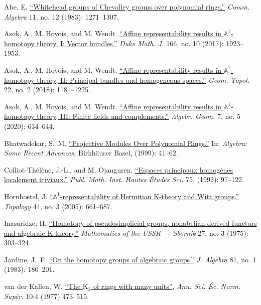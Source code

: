 \documentclass[oneside, 11pt]{amsart}
\numberwithin{equation}{section}
\newcommand{\K}{{\mathrm{K}}}
\theoremstyle{definition}
\theoremstyle{definition}
\theoremstyle{remark}
\begin{document}
\begin{thebibliography}{0}

Abe, E.
\href{http://dx.doi.org/10.1080/00927878308822906}{``Whitehead groups of {C}hevalley groups over polynomial rings.''}
\textit{Comm. Algebra} 11, no. 12 (1983): {1271--1307}.

Asok, A., M. Hoyois, and M. Wendt.
\href{http://dx.doi.org/10.1215/00127094-0000014X}{``Affine representability results in $\mathbb{A}^1$-homotopy theory, I: Vector bundles.''}
\textit{Duke Math. J.} 166, no. 10 (2017): 1923--1953.

Asok, A., M. Hoyois, and M. Wendt.
\href{http://dx.doi.org/10.2140/gt.2018.22.1181}{``Affine representability results in $\mathbb{A}^1$-homotopy theory, II: Principal bundles and homogeneous spaces.''}
\textit{Geom. Topol.} 22, no. 2 (2018): 1181--1225.
  
Asok, A., M. Hoyois, and M. Wendt.
\href{http://dx.doi.org/10.14231/AG-2020-023}{``Affine representability results in $\mathbb{A}^1$-homotopy theory, III: Finite fields and complements.''}
\textit{Algebr. Geom.} 7, no. 5 (2020): 634--644.

Bhatwadekar, S.~M.
\href{http://dx.doi.org/10.1007/978-3-0348-9996-3_3}{``Projective Modules Over Polynomial Rings.''}
In: \textit{Algebra: Some Recent Advances,} Birkh{\"a}user Basel, (1999): 41--62.

Colliot-Th{\'e}l{\`e}ne, J.-L., and M. Ojanguren.
\href{http://www.numdam.org/article/PMIHES_1992__75__97_0.pdf}{``Espaces principaux homog{\`e}nes localement triviaux.''} \textit{Publ. Math. Inst. Hautes {\'E}tudes Sci.} 75, (1992): {97--122}.

Hornbostel, J.
\href{http://dx.doi.org/10.1016/j.top.2004.10.004}{``$\mathbb{A}^1$-representability of Hermitian K-theory and Witt groups.''} \textit{Topology} {44}, no. {3} (2005): {661--687}.  

Inasaridze, H.
\href{http://dx.doi.org/10.1070/sm1975v027n03abeh002516}{``Homotopy of pseudosimplicial groups, nonabelian derived functors and algebraic K-theory.''}
\textit{Mathematics of the USSR --- Sbornik} 27, no. 3 (1975): 303--324.

Jardine, J.~F. 
\href{https://core.ac.uk/download/pdf/82406606.pdf}{``On the homotopy groups of algebraic groups.''}
\textit{J. Algebra} 81, no. 1 (1983): 180--201.

van der Kallen, W. \href{http://www.numdam.org/item/?id=ASENS_1977_4_10_4_473_0}{``The $\K_2$ of rings with many units''}, \textit{Ann. Sci. {\'E}c. Norm. Sup{\'e}r.} 10:4 (1977) 473–515.
  

\end{thebibliography}
\end{document}
